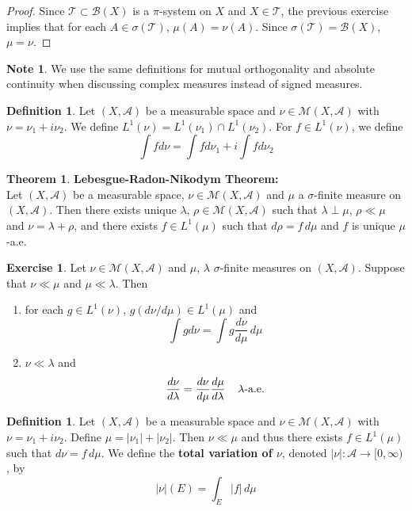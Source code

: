 \documentclass{book}
\theoremstyle{definition}
\newtheorem{defn}[definition]{Definition}
\newtheorem{note}[definition]{Note}
\newtheorem{thm}[definition]{Theorem}
\newtheorem{ex}[definition]{Exercise}
\newcommand{\lam}{\lambda}
\newcommand{\sig}{\sigma}
\newcommand{\MA}{\mathcal{A}}
\newcommand{\MB}{\mathcal{B}}
\newcommand{\MM}{\mathcal{M}}
\newcommand{\MT}{\mathcal{T}}
\newcommand{\lex}[1]{\label{ex:#1}}
\newcommand{\ld}[1]{\label{defn:#1}}
\DeclareMathOperator*{\0}{\mbf{0}}
\DeclareMathOperator*{\1}{\mbf{1}}
\newcommand{\Rg}{[0,\infty)}
\newcommand{\dmu}{\, d \mu}
\begin{document}
	\begin{proof}
		Since $\MT \subset \MB(X)$ is a $\pi$-system on $X$ and $X \in \MT$, the previous exercise implies that for each $A \in \sig(\MT)$, $\mu(A) = \nu(A)$. Since $\sig(\MT) = \MB(X)$, $\mu = \nu$. 
	\end{proof}
	
	\begin{note}
		We use the same definitions for mutual orthogonality and absolute continuity when discussing complex measures instead of signed measures.
	\end{note}
	
	\begin{defn} \ld{43003} 
		Let $(X,\MA)$ be a measurable space and $\nu \in \MM(X, \MA)$ with $\nu = \nu_1 + i\nu_2$. We define $L^1(\nu) = L^1(\nu_1)\cap L^1(\nu_2)$. For $f \in L^1(\nu)$, we define $$\int f d\nu = \int fd\nu_1 + i \int f d \nu_2$$
	\end{defn}
	
	\begin{thm}\textbf{Lebesgue-Radon-Nikodym Theorem:}\\
		Let $(X,\MA)$ be a measurable space, $\nu \in \MM(X, \MA)$ and $\mu$ a $\sig$-finite measure on $(X, \MA)$. Then there exists unique $\lam$, $\rho \in \MM(X, \MA)$ such that $\lam \perp \mu$, $\rho \ll \mu$ and $\nu = \lam + \rho$, and there exists $f \in L^1(\mu)$ such that $d\rho = f \dmu$ and $f$ is unique $\mu$-a.e.  
	\end{thm}
	
	\begin{ex} \lex{43003.2}
		Let $\nu \in \MM(X, \MA)$ and $\mu$, $\lam$ $\sig$-finite measures on $(X,\MA)$. Suppose that $\nu \ll \mu$ and $\mu \ll \lam$. Then 
		\begin{enumerate}
			\item for each $g \in L^1(\nu)$, $g(d\nu/d\mu) \in  L^1(\mu)$ and $$\int g d\nu = \int g \frac{d\nu}{d\mu} \dmu$$
			\item $\nu \ll \lam$ and $$\frac{d \nu}{d\lam} = \frac{d \nu}{d\mu} \frac{d\mu}{d\lam} \hspace{4mm} \lam \text{-a.e.}$$
		\end{enumerate}
	\end{ex}
	
	\begin{defn} \ld{43004} 
	Let $(X,\MA)$ be a measurable space and $\nu \in \MM(X,\MA)$ with $ \nu = \nu_1 + i \nu_2$. Define $\mu = |\nu_1| + |\nu_2|$. Then $\nu \ll \mu$ and thus there exists $f \in L^1(\mu)$ such that $d\nu = f \dmu$. We define the \textbf{total variation of $\nu$}, denoted $|\nu|: \MA \rightarrow \Rg$, by $$|\nu|(E) = \int_E |f|\dmu$$ 
	\end{defn}
	
\end{document}
